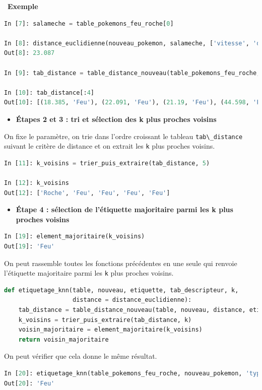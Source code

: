 \documentclass[
  11pt,
]{article}
\newcommand{\passthrough}[1]{#1}
\providecommand{\tightlist}{%
  \setlength{\itemsep}{0pt}\setlength{\parskip}{0pt}}
\newcounter{def}
\newcounter{exple}
\newenvironment{exemple}[1]
{\par \medskip   \addtocounter{exple}{1} \noindent  
\begin{bclogo}[arrondi =0.1,   noborder = true, logo=\bclampe, marge=4]{~\textbf{Exemple} \textbf{\theexple} {\itshape #1} }  \par}
{
\end{bclogo}
 \par \bigskip }
\begin{document}
\begin{exemple}{}
\begin{lstlisting}[language=Python]
In [7]: salameche = table_pokemons_feu_roche[0]

In [8]: distance_euclidienne(nouveau_pokemon, salameche, ['vitesse', 'defense'])
Out[8]: 23.087

In [9]: tab_distance = table_distance_nouveau(table_pokemons_feu_roche, nouveau_pokemon, distance_euclidienne, 'type',                                      ['vitesse', 'defense'])

In [10]: tab_distance[:4]
Out[10]: [(18.385, 'Feu'), (22.091, 'Feu'), (21.19, 'Feu'), (44.598, 'Feu')]
\end{lstlisting}

\begin{itemize}
\tightlist
\item
  \textbf{Étapes 2 et 3 : tri et sélection des k plus proches voisins}
\end{itemize}

On fixe le paramètre, on trie dans l'ordre croissant le tableau
\passthrough{\lstinline!tab\_distance!} suivant le critère de distance
et on extrait les \passthrough{\lstinline!k!} plus proches voisins.

\begin{lstlisting}[language=Python]
In [11]: k_voisins = trier_puis_extraire(tab_distance, 5)

In [12]: k_voisins
Out[12]: ['Roche', 'Feu', 'Feu', 'Feu', 'Feu']
\end{lstlisting}

\begin{itemize}
\tightlist
\item
  \textbf{Étape 4 : sélection de l'étiquette majoritaire parmi les k
  plus proches voisins}
\end{itemize}

\begin{lstlisting}[language=Python]
In [19]: element_majoritaire(k_voisins)
Out[19]: 'Feu'
\end{lstlisting}

On peut rassemble toutes les fonctions précédentes en une seule qui
renvoie l'étiquette majoritaire parmi les \passthrough{\lstinline!k!}
plus proches voisins.

\begin{lstlisting}[language=Python]
def etiquetage_knn(table, nouveau, etiquette, tab_descripteur, k,
                   distance = distance_euclidienne):    
    tab_distance = table_distance_nouveau(table, nouveau, distance, etiquette, tab_descripteur)
    k_voisins = trier_puis_extraire(tab_distance, k)
    voisin_majoritaire = element_majoritaire(k_voisins)
    return voisin_majoritaire
\end{lstlisting}

On peut vérifier que cela donne le même résultat.

\begin{lstlisting}[language=Python]
In [20]: etiquetage_knn(table_pokemons_feu_roche, nouveau_pokemon, 'type', ['vitesse', 'defense'], 5)
Out[20]: 'Feu'
\end{lstlisting}

\end{exemple}
\end{document}
